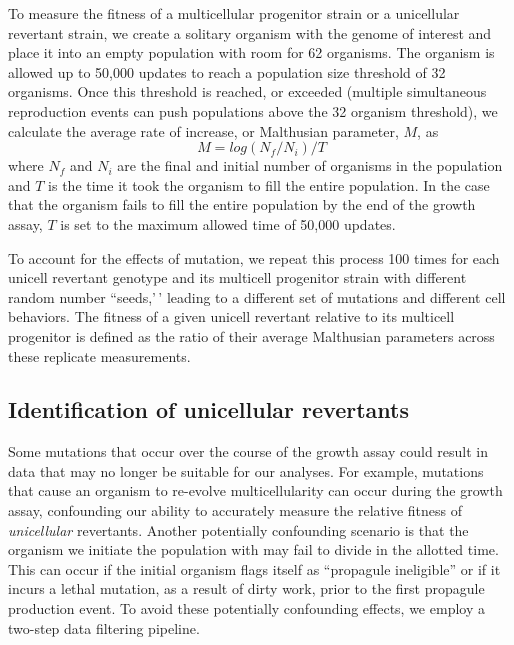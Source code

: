 \documentclass[
]{book}
\begin{document}
To measure the fitness of a multicellular progenitor strain or a unicellular revertant strain, we create a solitary organism with the genome of interest and place it into an empty population with room for 62 organisms. The organism is allowed up to 50,000 updates to reach a population size threshold of 32 organisms. Once this threshold is reached, or exceeded (multiple simultaneous reproduction events can push populations above the 32 organism threshold), we calculate the average rate of increase, or Malthusian parameter, \(M\), as
\begin{equation}
\ M = log(N_f / N_i )/T
\end{equation}
where \(N_f\) and \(N_i\) are the final and initial number of organisms in the population and \(T\) is the time it took the organism to fill the entire population. In the case that the organism fails to fill the entire population by the end of the growth assay, \(T\) is set to the maximum allowed time of 50,000 updates.

To account for the effects of mutation, we repeat this process 100 times for each unicell revertant genotype and its multicell progenitor strain with different random number ``seeds,'\,' leading to a different set of mutations and different cell behaviors. The fitness of a given unicell revertant relative to its multicell progenitor is defined as the ratio of their average Malthusian parameters across these replicate measurements.

\hypertarget{identification-of-unicellular-revertants}{%
\subsection{Identification of unicellular revertants}\label{identification-of-unicellular-revertants}}

Some mutations that occur over the course of the growth assay could result in data that may no longer be suitable for our analyses. For example, mutations that cause an organism to re-evolve multicellularity can occur during the growth assay, confounding our ability to accurately measure the relative fitness of \textit{unicellular} revertants. Another potentially confounding scenario is that the organism we initiate the population with may fail to divide in the allotted time. This can occur if the initial organism flags itself as ``propagule ineligible'' or if it incurs a lethal mutation, as a result of dirty work, prior to the first propagule production event. To avoid these potentially confounding effects, we employ a two-step data filtering pipeline.
\end{document}
